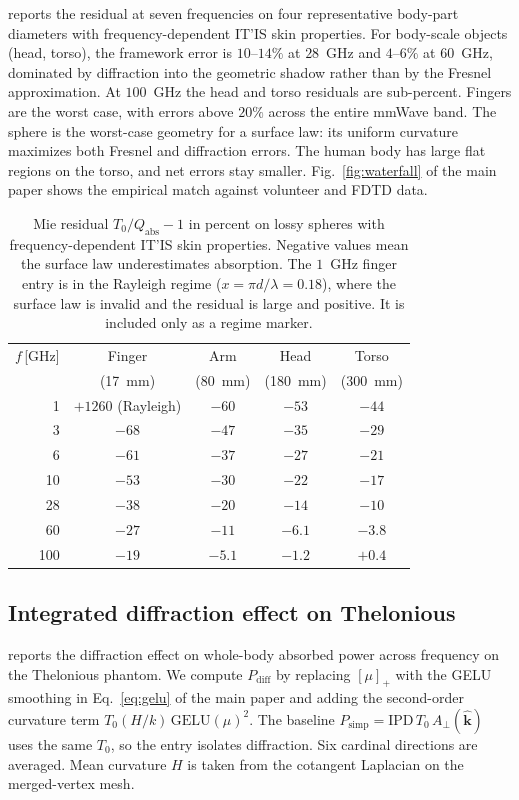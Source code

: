 \documentclass[journal,twocolumn,10pt]{IEEEtran}
\theoremstyle{plain}
\theoremstyle{remark}
\newcommand{\khat}{\hat{\bm{k}}}
\newcommand{\IPD}{\mathrm{IPD}}
\newcommand{\Aperp}{A_\perp}
\newcommand{\pospart}[1]{\left[#1\right]_{+}}
\begin{document}
 reports the residual at seven frequencies on
four representative body-part diameters with frequency-dependent
IT'IS skin properties. For body-scale objects (head, torso), the
framework error is $10$--$14\%$ at $28$~GHz and $4$--$6\%$ at
$60$~GHz, dominated by diffraction into the geometric shadow rather
than by the Fresnel approximation. At $100$~GHz the head and torso
residuals are sub-percent. Fingers are the worst case, with errors
above $20\%$ across the entire mmWave band. The sphere is the
worst-case geometry for a surface law: its uniform curvature
maximizes both Fresnel and diffraction errors. The human body has
large flat regions on the torso, and net errors stay smaller.
Fig.~\ref{fig:waterfall} of the main paper shows the empirical
match against volunteer and FDTD data.

\begin{table}[!t]
\centering
\footnotesize
\caption{Mie residual $T_0/Q_{\mathrm{abs}} - 1$ in percent on
lossy spheres with frequency-dependent IT'IS skin properties.
Negative values mean the surface law underestimates absorption.
The $1$~GHz finger entry is in the Rayleigh regime
($x = \pi d/\lambda = 0.18$), where the surface law is invalid and
the residual is large and positive. It is included only as a regime
marker.}
\label{tab:mie-residual}
\setlength{\tabcolsep}{4pt}
\begin{tabular}{rcccc}
\toprule
$f$\,[GHz] & Finger & Arm & Head & Torso \\
           & (17~mm) & (80~mm) & (180~mm) & (300~mm) \\
\midrule
1   & $+1260$ (Rayleigh) & $-60$ & $-53$ & $-44$ \\
3   & $-68$ & $-47$ & $-35$ & $-29$ \\
6   & $-61$ & $-37$ & $-27$ & $-21$ \\
10  & $-53$ & $-30$ & $-22$ & $-17$ \\
28  & $-38$ & $-20$ & $-14$ & $-10$ \\
60  & $-27$ & $-11$ & $-6.1$ & $-3.8$ \\
100 & $-19$ & $-5.1$ & $-1.2$ & $+0.4$ \\
\bottomrule
\end{tabular}
\end{table}


\subsection{Integrated diffraction effect on Thelonious}\label{si:diffraction-integrated}
 reports the diffraction effect on whole-body
absorbed power across frequency on the Thelonious phantom. We compute
$P_{\mathrm{diff}}$ by replacing $\pospart{\mu}$ with the GELU
smoothing in Eq.~\ref{eq:gelu} of the main paper and adding the
second-order curvature term $T_0(H/k)\,\mathrm{GELU}(\mu)^2$. The baseline $P_{\mathrm{simp}} =
\IPD\,T_0\,\Aperp(\khat)$ uses the same $T_0$, so the entry isolates
diffraction. Six cardinal directions are averaged. Mean curvature $H$
is taken from the cotangent Laplacian on the merged-vertex mesh.
\end{document}
